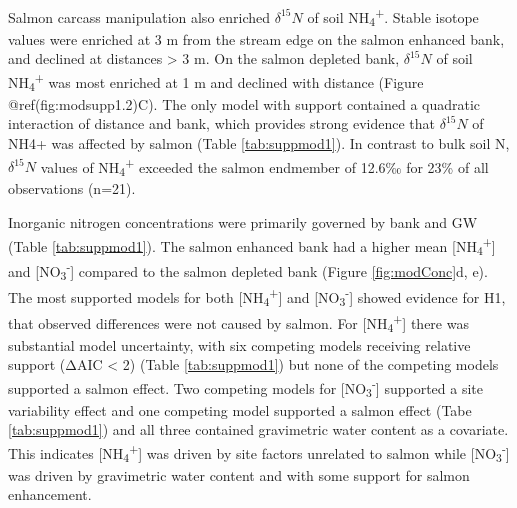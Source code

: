 \documentclass [11pt, proquest] {uwthesis}[2015/03/03]
\begin{document}
Salmon carcass manipulation also enriched \(\delta^{15}N\) of soil NH\textsubscript{4}\textsuperscript{+}. Stable isotope values were enriched at 3 m from the stream edge on the salmon enhanced bank, and declined at distances \textgreater{} 3 m. On the salmon depleted bank, \(\delta^{15}N\) of soil NH\textsubscript{4}\textsuperscript{+} was most enriched at 1 m and declined with distance (Figure @ref(fig:modsupp1.2)C). The only model with support contained a quadratic interaction of distance and bank, which provides strong evidence that \(\delta^{15}N\) of NH4+ was affected by salmon (Table \ref{tab:suppmod1}). In contrast to bulk soil N, \(\delta^{15}N\) values of NH\textsubscript{4}\textsuperscript{+} exceeded the salmon endmember of 12.6‰ for 23\% of all observations (n=21).

Inorganic nitrogen concentrations were primarily governed by bank and GW (Table \ref{tab:suppmod1}). The salmon enhanced bank had a higher mean {[}NH\textsubscript{4}\textsuperscript{+}{]} and {[}NO\textsubscript{3}\textsuperscript{-}{]} compared to the salmon depleted bank (Figure \ref{fig:modConc}d, e). The most supported models for both {[}NH\textsubscript{4}\textsuperscript{+}{]} and {[}NO\textsubscript{3}\textsuperscript{-}{]} showed evidence for H1, that observed differences were not caused by salmon. For {[}NH\textsubscript{4}\textsuperscript{+}{]} there was substantial model uncertainty, with six competing models receiving relative support (ΔAIC \textless{} 2) (Table \ref{tab:suppmod1}) but none of the competing models supported a salmon effect. Two competing models for {[}NO\textsubscript{3}\textsuperscript{-}{]} supported a site variability effect and one competing model supported a salmon effect (Tabe \ref{tab:suppmod1}) and all three contained gravimetric water content as a covariate. This indicates {[}NH\textsubscript{4}\textsuperscript{+}{]} was driven by site factors unrelated to salmon while {[}NO\textsubscript{3}\textsuperscript{-}{]} was driven by gravimetric water content and with some support for salmon enhancement.
\end{document}
